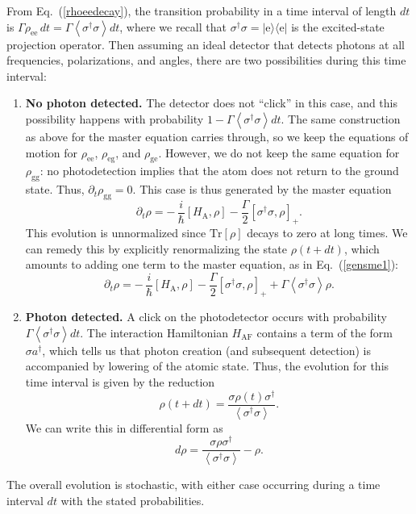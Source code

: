 \documentclass[aps,twocolumn,superscriptaddress,footinbib,floatfix,showpacs]{revtex4}
\def\ket#1{|{#1}\rangle}
\def\bra#1{\langle{#1}|}
\def\expct#1{\!\left\langle{#1}\right\rangle}
\def\HAF{H_\mathrm{\scriptscriptstyle AF}}
\def\HA{H_\mathrm{\scriptscriptstyle A}}
\begin{document}
\relax From Eq.~(\ref{rhoeedecay}), the transition probability in a time
interval of length $dt$ is $\Gamma\rho_\mathrm{ee}\,dt=\Gamma\expct{\sigma^\dagger\sigma}dt$,
where we recall that $\sigma^\dagger\sigma =\ket{\mathrm{e}}\bra{\mathrm{e}}$ is the
excited-state projection operator.
Then assuming an ideal detector that detects photons at all frequencies,
polarizations, and angles, there are two possibilities during this time interval:
\begin{enumerate}
\item \textbf{No photon detected.} The detector does not ``click'' in this
case, and this possibility happens with probability 
$1-\Gamma\expct{\sigma^\dagger\sigma}dt$.  The same construction 
as above for the master equation carries through, so we keep
the equations of motion for $\rho_\mathrm{ee}$, $\rho_\mathrm{eg}$,
and $\rho_\mathrm{ge}$.  However, we do not keep the same equation
for $\rho_\mathrm{gg}$: no photodetection implies that the atom
does not return to the ground state.  Thus, $\partial_t \rho_\mathrm{gg}=0$.
This case is thus generated by the master equation
\begin{equation}
  \partial_t\rho =-\,\frac{i}{\hbar}[\HA,\rho]-\frac{\Gamma}{2}[\sigma^\dagger\sigma,\rho]_+ .
\end{equation}
This evolution is unnormalized since $\mathrm{Tr}[\rho]$ decays to zero at long times.
We can remedy this by explicitly renormalizing the state $\rho(t+dt)$,
which amounts to adding one 
term to the master equation, as in Eq.~(\ref{gensme1}):
\begin{equation}
  \partial_t\rho =-\,\frac{i}{\hbar}[\HA,\rho]-\frac{\Gamma}{2}[\sigma^\dagger\sigma,\rho]_+ 
    +\Gamma\expct{\sigma^\dagger\sigma}\rho.
\end{equation}


\item \textbf{Photon detected.}  A click on the photodetector
occurs with probability 
$\Gamma\expct{\sigma^\dagger\sigma}dt$.
The interaction Hamiltonian $\HAF$ contains a term of the form $\sigma a^\dagger$,
which tells us that photon creation (and subsequent detection) 
is accompanied by lowering of the atomic state.
Thus, the evolution for this time interval is given by the reduction
\begin{equation}
  \rho(t+dt) = \frac{\sigma\rho(t)\sigma^\dagger}{\expct{\sigma^\dagger\sigma}}.
\end{equation}
We can write this in differential form as
\begin{equation}
  d\rho = \frac{\sigma\rho\sigma^\dagger}{\expct{\sigma^\dagger\sigma}}-\rho.
\end{equation}

\end{enumerate}
The overall evolution is stochastic, with either case occurring during a
time interval $dt$ with the stated probabilities. 
 
\end{document}
